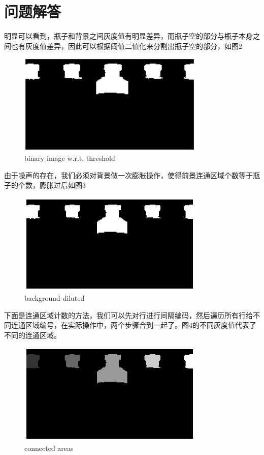 \documentclass[UTF8]{ctexart}
\begin{document}
\section{问题解答}
明显可以看到，瓶子和背景之间灰度值有明显差异，而瓶子空的部分与瓶子本身之间也有灰度值差异，因此可以根据阈值二值化来分割出瓶子空的部分，如图2\par
\begin{figure}[htbp]
\centerline{\includegraphics[width=3.5in]{thres.eps}}
\caption[]{binary image w.r.t. threshold}
\end{figure}\par
由于噪声的存在，我们必须对背景做一次膨胀操作，使得前景连通区域个数等于瓶子的个数，膨胀过后如图3\par
\begin{figure}[htbp]
\centerline{\includegraphics[width=3.5in]{diluted.eps}}
\caption[]{background diluted}
\end{figure}\par
下面是连通区域计数的方法，我们可以先对行进行间隔编码，然后遍历所有行给不同连通区域编号，在实际操作中，两个步骤合到一起了。图4的不同灰度值代表了不同的连通区域。\par
\begin{figure}[htbp]
\centerline{\includegraphics[width=3.5in]{class.eps}}
\caption[]{connected areas}
\end{figure}\par
\end{document}
